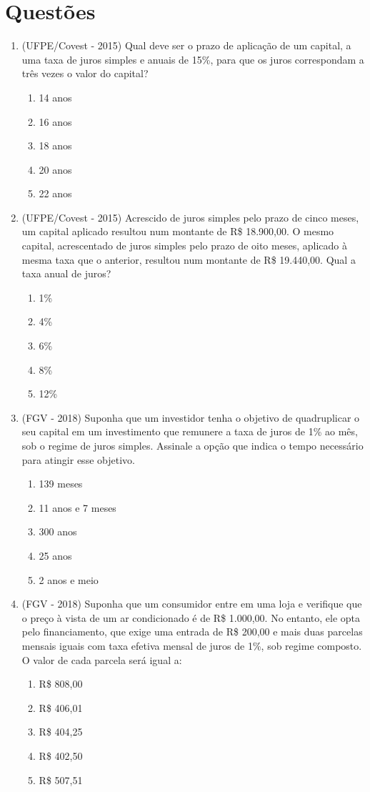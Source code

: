 \section{Questões}
 \begin{enumerate}
 
  \item (UFPE/Covest - 2015) Qual deve ser o prazo de aplicação de um capital, a uma taxa de juros simples e anuais de 15\%, para que os juros correspondam a três vezes o valor do capital?
  \begin{enumerate}
  \item 14 anos
  \item 16 anos
  \item 18 anos
  \item 20 anos
  \item 22 anos
  \end{enumerate}
  
  \item (UFPE/Covest - 2015) Acrescido de juros simples pelo prazo de cinco meses, um capital aplicado resultou num montante de R\$ 18.900,00. O mesmo capital, acrescentado de juros simples pelo prazo de oito meses, aplicado à mesma taxa que o anterior, resultou num montante de R\$ 19.440,00. Qual a taxa anual de juros?
  \begin{enumerate}
  \item 1\%
  \item 4\%
  \item 6\%
  \item 8\%
  \item 12\%
  \end{enumerate}
  
  \item (FGV - 2018) Suponha que um investidor tenha o objetivo de quadruplicar o seu capital em um investimento que remunere a taxa de juros de 1\% ao mês, sob o regime de juros simples. Assinale a opção que indica o tempo necessário para atingir esse objetivo.
  \begin{enumerate}
  \item 139 meses
  \item 11 anos e 7 meses
  \item 300 anos
  \item 25 anos
  \item 2 anos e meio
  \end{enumerate}
  
  \item (FGV - 2018) Suponha que um consumidor entre em uma loja e verifique que o preço à vista de um ar condicionado é de R\$ 1.000,00. No entanto, ele opta pelo financiamento, que exige uma entrada de R\$ 200,00 e mais duas parcelas mensais iguais com taxa efetiva mensal de juros de 1\%, sob regime composto. O valor de cada parcela será igual a:
  \begin{enumerate}
  \item R\$ 808,00
  \item R\$ 406,01
  \item R\$ 404,25
  \item R\$ 402,50
  \item R\$ 507,51
  \end{enumerate}
  

\end{enumerate}
